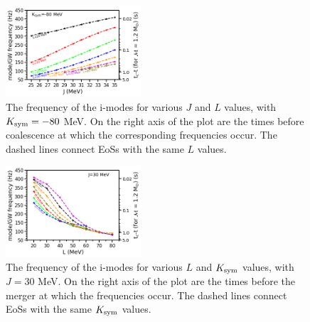 \documentclass[fleqn,usenatbib]{mnras}
\begin{document}


\begin{figure}
\centering
\includegraphics[width=0.45\textwidth,angle=0]{J_L_f_tc_K-80.png}
\caption{The frequency of the i-modes for various $J$ and $L$ values, with $K_{\rm sym}=-80$ MeV. On the right axis of the plot are the times before coalescence at which the corresponding frequencies occur. The dashed lines connect EoSs with the same $L$ values.}
\label{fig:J_vs_L_vs_f+tc}
\end{figure}


\begin{figure}
\centering
\includegraphics[width=0.45\textwidth,angle=0]{L_K_f_tc_J30.png}
\caption{The frequency of the i-modes for various $L$ and $K_{\rm sym}$ values, with $J=30$ MeV. On the right axis of the plot are the times before the merger at which the frequencies occur. The dashed lines connect EoSs with the same $K_{\rm sym}$ values.}
\label{fig:L_vs_K_vs_f+tc}
\end{figure}
\end{document}

